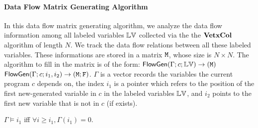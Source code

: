 \paragraph{Data Flow Matrix Generating Algorithm}
%
In this data flow matrix generating algorithm, we analyze the data flow information among all labeled variables $\mathbb{LV}$ collected via the the $\bf{VetxCol}$ algorithm of length $N$.
%
We track the data flow relations between all these labeled variables. These informations are stored in a matrix $\mathtt{M}$, whose size is $N \times N$. 
%
The algorithm to fill in the matrix is of the form: 
{$\mathsf{FlowGen}{(\Gamma ; {c} ; \mathbb{LV})}\to {(\ensuremath{\mathtt{M}})}$}
$\mathsf{FlowGen}{(\Gamma ; {c} ; i_1, i_2)}\to {(\ensuremath{\mathtt{M}}; \ensuremath{\mathtt{F}})}$. 
$\Gamma$ is a vector records the variables the current program ${c}$ depends on, the index $i_1$ is a pointer which refers to the position of the first new-generated variable in ${c}$ in the labeled variables $\mathbb{LV}$, and $i_2$ points to the first new variable that is not in ${c}$ (if exists). 
%
%
{
\begin{defn}
$\Gamma \vDash i_1$ iff $\forall i \geq i_1, \Gamma(i_1)=0 $.  
\end{defn}
}
%
